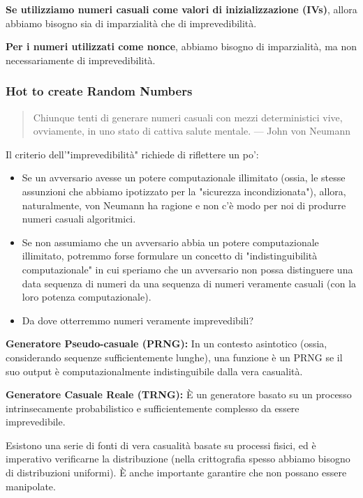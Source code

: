 \documentclass[11pt]{article}
\theoremstyle{definition} \newtheorem{definizione}{Definizione}[section] %
\begin{document}
    \textbf{Se utilizziamo numeri casuali come valori di inizializzazione (IVs)}, allora abbiamo bisogno sia di imparzialità che di imprevedibilità.

    \textbf{Per i numeri utilizzati come nonce}, abbiamo bisogno di imparzialità, ma non necessariamente di imprevedibilità.

        \subsubsection*{Hot to create Random Numbers}
        \begin{quote}
        Chiunque tenti di generare numeri casuali con mezzi deterministici vive, ovviamente, in uno stato di cattiva salute mentale. — John von Neumann
        \end{quote}
        
        Il criterio dell'"imprevedibilità" richiede di riflettere un po':
        \begin{itemize}
        \item Se un avversario avesse un potere computazionale illimitato (ossia, le stesse assunzioni che abbiamo ipotizzato per la "sicurezza incondizionata"), allora, naturalmente, von Neumann ha ragione e non c'è modo per noi di produrre numeri casuali algoritmici.
        \item Se non assumiamo che un avversario abbia un potere computazionale illimitato, potremmo forse formulare un concetto di "indistinguibilità computazionale" in cui speriamo che un avversario non possa distinguere una data sequenza di numeri da una sequenza di numeri veramente casuali (con la loro potenza computazionale).
        \item Da dove otterremmo numeri veramente imprevedibili?
        \end{itemize}

        \textbf{Generatore Pseudo-casuale (PRNG):} In un contesto asintotico (ossia, considerando sequenze sufficientemente lunghe), una funzione è un PRNG se il suo output è computazionalmente indistinguibile dalla vera casualità.

        \textbf{Generatore Casuale Reale (TRNG):} È un generatore basato su un processo intrinsecamente probabilistico e sufficientemente complesso da essere imprevedibile.

        Esistono una serie di fonti di vera casualità basate su processi fisici, ed è imperativo verificarne la distribuzione (nella crittografia spesso abbiamo bisogno di distribuzioni uniformi). È anche importante garantire che non possano essere manipolate.
\end{document}
